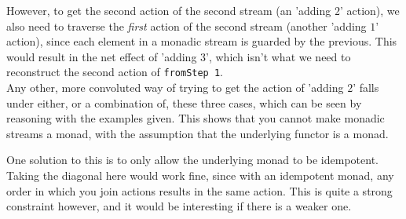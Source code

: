 However, to get the second action of the second stream (an 'adding $2$' action), we also need to traverse the \emph {first} action of the second stream (another 'adding $1$' action), since each element in a monadic stream is guarded by the previous. This would result in the net effect of 'adding $3$', which isn't what we need to reconstruct the second action of \verb+fromStep 1+. \\

Any other, more convoluted way of trying to get the action of 'adding $2$' falls under either, or a combination of, these three cases, which can be seen by reasoning with the examples given. This shows that you cannot make monadic streams a monad, with the assumption that the underlying functor is a monad.

One solution to this is to only allow the underlying monad to be idempotent. Taking the diagonal here would work fine, since with an idempotent monad, any order in which you join actions results in the same action. This is quite a strong constraint however, and it would be interesting if there is a weaker one.

